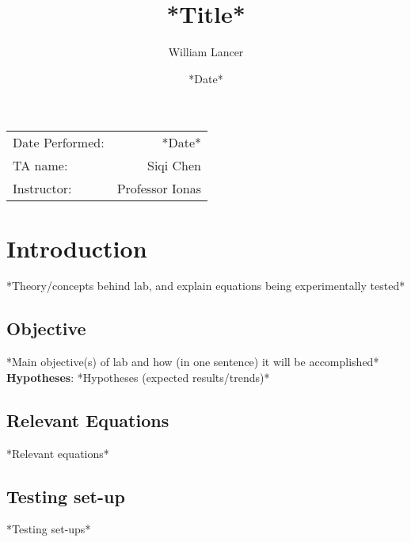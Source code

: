 \documentclass[
	letterpaper, %
	10pt, %
]{CSUniSchoolLabReport}
\title{*Title*\\
} %
\author{William Lancer} %
\date{*Date*} %
\begin{document}
\maketitle %

\begin{center}
	\begin{tabular}{l r}
		Date Performed: & *Date* \\ %
		TA name: & Siqi Chen\\ %
		Instructor: & Professor Ionas %
	\end{tabular}
\end{center}


\vspace{5in}
\section{Introduction}
*Theory/concepts behind lab, and explain equations being experimentally tested*
\subsection{Objective}
*Main objective(s) of lab and how (in one sentence) it will be accomplished*
\textbf{Hypotheses}:
*Hypotheses (expected results/trends)*
\subsection{Relevant Equations}
*Relevant equations*
\subsection{Testing set-up}
*Testing set-ups*
\end{document}
